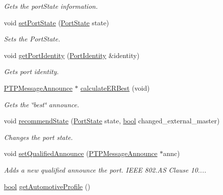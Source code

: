 \begin{DoxyCompactItemize}
\begin{DoxyCompactList}\small\item\em Gets the port\+State information. \end{DoxyCompactList}\item 
void \hyperlink{class_common_port_a8e4a7a3f199cde3540ed0d1ab10386e5}{set\+Port\+State} (\hyperlink{ptptypes_8hpp_a679431f1afc75d7bb9e972c022e53672}{Port\+State} state)
\begin{DoxyCompactList}\small\item\em Sets the Port\+State. \end{DoxyCompactList}\item 
void \hyperlink{class_common_port_a563117781330d95f1c6aa43837b7e4ed}{get\+Port\+Identity} (\hyperlink{class_port_identity}{Port\+Identity} \&identity)
\begin{DoxyCompactList}\small\item\em Gets port identity. \end{DoxyCompactList}\item 
\hyperlink{class_p_t_p_message_announce}{P\+T\+P\+Message\+Announce} $\ast$ \hyperlink{class_common_port_a6951410ed8e6a5ef44a028ef0a50cdeb}{calculate\+E\+R\+Best} (void)
\begin{DoxyCompactList}\small\item\em Gets the \char`\"{}best\char`\"{} announce. \end{DoxyCompactList}\item 
void \hyperlink{class_common_port_aa7588da5b66a33afeeda586e6abd334a}{recommend\+State} (\hyperlink{ptptypes_8hpp_a679431f1afc75d7bb9e972c022e53672}{Port\+State} state, \hyperlink{avb__gptp_8h_af6a258d8f3ee5206d682d799316314b1}{bool} changed\+\_\+external\+\_\+master)
\begin{DoxyCompactList}\small\item\em Changes the port state. \end{DoxyCompactList}\item 
void \hyperlink{class_common_port_a6d8b30d648cbd6048a083e64bf3cd0dd}{set\+Qualified\+Announce} (\hyperlink{class_p_t_p_message_announce}{P\+T\+P\+Message\+Announce} $\ast$annc)
\begin{DoxyCompactList}\small\item\em Adds a new qualified announce the port. I\+E\+EE 802.\+AS Clause 10.... \end{DoxyCompactList}\item 
\hyperlink{avb__gptp_8h_af6a258d8f3ee5206d682d799316314b1}{bool} \hyperlink{class_common_port_ad8dc4b5a985b466538d6805970eb0176}{get\+Automotive\+Profile} ()

\end{DoxyCompactItemize}
